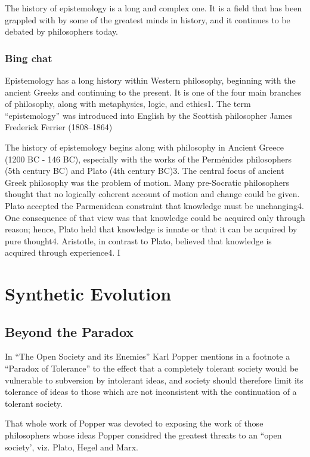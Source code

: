 \documentclass[10pt,titlepage]{book}
\begin{document}
The history of epistemology is a long and complex one. It is a field that has been grappled with by some of the greatest minds in history, and it continues to be debated by philosophers today.

\section{Bing chat}

Epistemology has a long history within Western philosophy, beginning with the ancient Greeks and continuing to the present. It is one of the four main branches of philosophy, along with metaphysics, logic, and ethics1. The term “epistemology” was introduced into English by the Scottish philosopher James Frederick Ferrier (1808–1864)

The history of epistemology begins along with philosophy in Ancient Greece (1200 BC - 146 BC), especially with the works of the Perménides philosophers (5th century BC) and Plato (4th century BC)3. The central focus of ancient Greek philosophy was the problem of motion. Many pre-Socratic philosophers thought that no logically coherent account of motion and change could be given. Plato accepted the Parmenidean constraint that knowledge must be unchanging4. One consequence of that view was that knowledge could be acquired only through reason; hence, Plato held that knowledge is innate or that it can be acquired by pure thought4. Aristotle, in contrast to Plato, believed that knowledge is acquired through experience4.
I

\part{Synthetic Evolution}

\chapter{Beyond the Paradox}

In ``The Open Society and its Enemies'' Karl Popper mentions in a footnote a ``Paradox of Tolerance'' to the effect that a completely tolerant society would be vulnerable to subversion by intolerant ideas, and society should therefore limit its tolerance of ideas to those which are not inconsistent with the continuation of a tolerant society.

That whole work of Popper was devoted to exposing the work of those philosophers whose ideas Popper considred the greatest threats to an ``open society', viz. Plato, Hegel and Marx.
\end{document}
